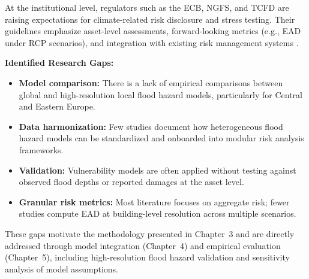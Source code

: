 At the institutional level, regulators such as the ECB, NGFS, and TCFD are raising expectations for climate-related risk disclosure and stress testing. Their guidelines emphasize asset-level assessments, forward-looking metrics (e.g., EAD under RCP scenarios), and integration with existing risk management systems \cite{ecb2020, tcfd2017, bavandi_physical_2022}.

\vspace{1em}
\noindent\textbf{Identified Research Gaps:}
\begin{itemize}
    \item \textbf{Model comparison:} There is a lack of empirical comparisons between global and high-resolution local flood hazard models, particularly for Central and Eastern Europe.
    \item \textbf{Data harmonization:} Few studies document how heterogeneous flood hazard models can be standardized and onboarded into modular risk analysis frameworks.
    \item \textbf{Validation:} Vulnerability models are often applied without testing against observed flood depths or reported damages at the asset level.
    \item \textbf{Granular risk metrics:} Most literature focuses on aggregate risk; fewer studies compute EAD at building-level resolution across multiple scenarios.
\end{itemize}

These gaps motivate the methodology presented in Chapter~3 and are directly addressed through model integration (Chapter~4) and empirical evaluation (Chapter~5), including high-resolution flood hazard validation and sensitivity analysis of model assumptions.
